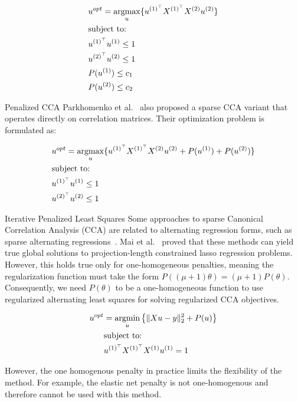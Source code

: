 \begin{align}
    \label{eq:pmd}
    & u^{opt}=\underset{u}{\mathrm{argmax}}\{ u^{(1)^{\top}} X^{(1)^{\top}} X^{(2)} u^{(2)} \} \\
    & \text{subject to:} \notag \\
    & u^{(1)^{\top}} u^{(1)} \leq 1 \notag \\
    & u^{(2)^{\top}} u^{(2)} \leq 1 \notag \\
    & P(u^{(1)}) \leq c_1 \notag \\
    & P(u^{(2)}) \leq c_2 \notag
\end{align}

Penalized CCA Parkhomenko et al.\ \cite{parkhomenko2009sparse} also proposed a sparse CCA variant that
operates directly on correlation matrices.
Their optimization problem is formulated as:

\begin{align}
    \label{eq:pmd}
    & u^{opt}=\underset{u}{\mathrm{argmax}}\{ u^{(1)^{\top}} X^{(1)^{\top}} X^{(2)} u^{(2)} + P(u^{(1)})+ P(u^{(2)})\}\\
    & \text{subject to:} \notag \\
    & u^{(1)^{\top}} u^{(1)} \leq 1 \notag \\
    & u^{(2)^{\top}} u^{(2)} \leq 1 \notag \\
\end{align}

Iterative Penalized Least Squares Some approaches to sparse Canonical Correlation Analysis (CCA) are related to alternating regression forms, such as sparse alternating regressions~\cite{wilms2015sparse}.
Mai et al.~\cite{mai2019iterative} proved that these methods can yield true global solutions to projection-length constrained lasso regression problems.
However, this holds true only for one-homogeneous penalties, meaning the regularization function must take the form \( P((\mu + 1)\theta) = (\mu + 1)P(\theta) \). Consequently, we need \( P(\theta) \) to be a one-homogeneous function to use regularized alternating least squares for solving regularized CCA objectives.

\begin{align}
    \label{eq:mai}
    u^{opt} &= \underset{u}{\mathrm{argmin}} \left\{ \|Xu - y\|_2^2 + P(u) \right\} \\
    &\text{subject to:} \notag \\
    &u^{(1)^{\top}} X^{(1)^{\top}} X^{(1)} u^{(1)}=1 \notag
\end{align}

However, the one homogenous penalty in practice limits the flexibility of the method.
For example, the elastic net penalty is not one-homogenous and therefore cannot be used with this method.

